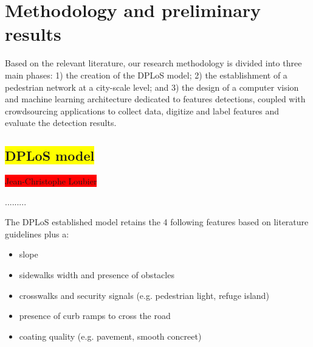 \documentclass[10pt,conference,a4paper]{IEEEtran}
\begin{document}





\section{Methodology and preliminary results}
Based on the relevant literature, our research methodology is divided into three main phases: 1) the creation of the DPLoS model; 2) the establishment of a pedestrian network at a city-scale level; and 3) the design of a computer vision and machine learning architecture dedicated to features detections, coupled with crowdsourcing applications to collect data, digitize and label features and evaluate the detection results.

\subsection{\colorbox{yellow}{DPLoS model}}
\colorbox{red}{Jean-Christophe Loubier}

.........


The DPLoS established model retains the 4 following features based on literature guidelines plus a: %
\begin{itemize}
\item slope
\item sidewalks width and presence of obstacles
\item crosswalks and security signals (e.g. pedestrian light, refuge island)
\item presence of curb ramps to cross the road
\item coating quality (e.g. pavement, smooth concreet)
\end{itemize}
\end{document}
